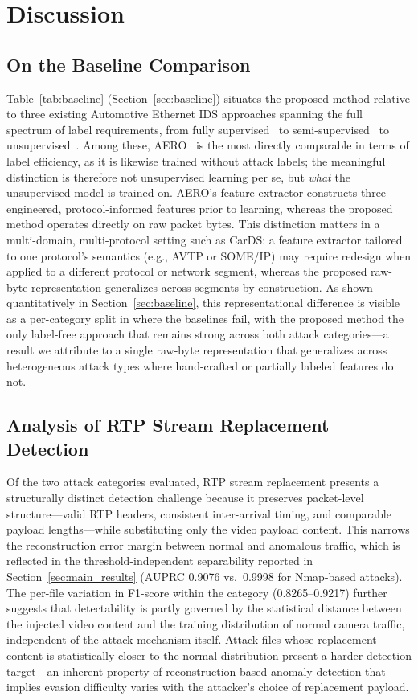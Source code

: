 \section{Discussion}
\label{sec:discussion}
\subsection{On the Baseline Comparison}
\label{sec:baseline_discussion}
Table~\ref{tab:baseline} (Section~\ref{sec:baseline}) situates the proposed method relative to three existing Automotive Ethernet IDS approaches spanning the full spectrum of label requirements, from fully supervised~\cite{jeong2021convolutional} to semi-supervised~\cite{shibly2023feature} to unsupervised~\cite{jeong2023aero}. Among these, AERO~\cite{jeong2023aero} is the most directly comparable in terms of label efficiency, as it is likewise trained without attack labels; the meaningful distinction is therefore not unsupervised learning per se, but \emph{what} the unsupervised model is trained on. AERO's feature extractor constructs three engineered, protocol-informed features prior to learning, whereas the proposed method operates directly on raw packet bytes. This distinction matters in a multi-domain, multi-protocol setting such as CarDS: a feature extractor tailored to one protocol's semantics (e.g., AVTP or SOME/IP) may require redesign when applied to a different protocol or network segment, whereas the proposed raw-byte representation generalizes across segments by construction. As shown quantitatively in Section~\ref{sec:baseline}, this representational difference is visible as a per-category split in where the baselines fail, with the proposed method the only label-free approach that remains strong across both attack categories---a result we attribute to a single raw-byte representation that generalizes across heterogeneous attack types where hand-crafted or partially labeled features do not.

\subsection{Analysis of RTP Stream Replacement Detection}
Of the two attack categories evaluated, RTP stream replacement presents a structurally distinct detection challenge because it preserves packet-level structure---valid RTP headers, consistent inter-arrival timing, and comparable payload lengths---while substituting only the video payload content. This narrows the reconstruction error margin between normal and anomalous traffic, which is reflected in the threshold-independent separability reported in Section~\ref{sec:main_results} (AUPRC 0.9076 vs.\ 0.9998 for Nmap-based attacks). The per-file variation in F1-score within the category (0.8265--0.9217) further suggests that detectability is partly governed by the statistical distance between the injected video content and the training distribution of normal camera traffic, independent of the attack mechanism itself. Attack files whose replacement content is statistically closer to the normal distribution present a harder detection target---an inherent property of reconstruction-based anomaly detection that implies evasion difficulty varies with the attacker's choice of replacement payload.


